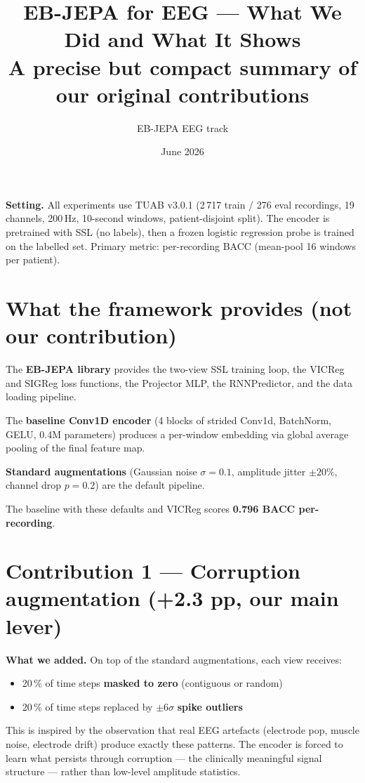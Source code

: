 \documentclass[11pt,a4paper]{article}
\title{\textbf{EB-JEPA for EEG — What We Did and What It Shows}\\
\large A precise but compact summary of our original contributions}
\author{EB-JEPA EEG track}
\date{June 2026}
\begin{document}
\maketitle

\noindent\textbf{Setting.}
All experiments use TUAB v3.0.1 (2\,717 train / 276 eval recordings,
19 channels, 200\,Hz, 10-second windows, patient-disjoint split).
The encoder is pretrained with SSL (no labels), then a frozen logistic
regression probe is trained on the labelled set.
Primary metric: per-recording BACC (mean-pool 16 windows per patient).

\bigskip

\section{What the framework provides (not our contribution)}

The \textbf{EB-JEPA library} provides the two-view SSL training loop,
the VICReg and SIGReg loss functions, the Projector MLP, the RNNPredictor,
and the data loading pipeline.

The \textbf{baseline Conv1D encoder} (4 blocks of strided Conv1d, BatchNorm,
GELU, 0.4M parameters) produces a per-window embedding via global average pooling
of the final feature map.

\textbf{Standard augmentations} (Gaussian noise $\sigma{=}0.1$, amplitude
jitter $\pm20\%$, channel drop $p{=}0.2$) are the default pipeline.

The baseline with these defaults and VICReg scores \textbf{0.796 BACC per-recording}.

\bigskip

\section{Contribution 1 — Corruption augmentation (+2.3 pp, our main lever)}

\textbf{What we added.}
On top of the standard augmentations, each view receives:
\begin{itemize}[noitemsep]
  \item 20\,\% of time steps \textbf{masked to zero} (contiguous or random)
  \item 20\,\% of time steps replaced by $\pm 6\sigma$ \textbf{spike outliers}
\end{itemize}
This is inspired by the observation that real EEG artefacts (electrode pop,
muscle noise, electrode drift) produce exactly these patterns.  The encoder
is forced to learn what persists through corruption — the clinically meaningful
signal structure — rather than low-level amplitude statistics.
\end{document}
